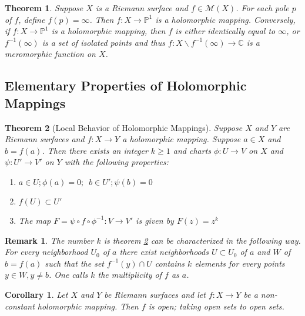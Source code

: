 \documentclass{article}
\newtheorem{thm}{Theorem}
\newtheorem{rmk}{Remark}
\newtheorem{cor}{Corollary}
\begin{document}
\begin{thm}

Suppose $X$ is a Riemann surface and $f \in \mathcal{M}(X)$. For each pole $p$ of $f$, define $f(p)= \infty$. Then $f: X \to \mathbb{P}^1$ is a holomorphic mapping. Conversely, if $f: X \to \mathbb{P}^1$ is a holomorphic mapping, then $f$ is either identically equal to $\infty$, or $f^{-1}(\infty)$ is a set of isolated points and thus $f: X \backslash f^{-1}(\infty) \to \mathbb{C}$ is a meromorphic function on $X$.
\end{thm}

\subsection{Elementary Properties of Holomorphic Mappings}

\begin{thm}[Local Behavior of Holomorphic Mappings]
\label{thm:local-holomorph}
Suppose $X$ and $Y$ are Riemann surfaces and $f: X \to Y$ a holomorphic mapping. Suppose $a \in X$ and $b = f(a)$. Then there exists an integer $k \geq 1$ and charts $\phi:U \to V$ on $X$ and $\psi: U' \to V'$ on $Y$ with the following properties:

\begin{enumerate}
    \item $a \in U; \phi(a)=0; \hspace{6pt} b \in U'; \psi(b)=0$
    \item $f(U) \subset U'$
    \item The map $F = \psi \circ f \circ \phi^{-1}: V \to V'$ is given by $F(z) = z^k$
\end{enumerate}


\end{thm}

\begin{rmk}

The number $k$ is theorem \ref{thm:local-holomorph} can be characterized in the following way. For every neighborhood $U_0$ of $a$ there exist neighborhoods $U \subset U_0$ of $a$ and $W$ of $b=f(a)$ such that the set $f^{-1}(y) \cap U$ contains $k$ elements for every points $y \in W, y \neq b$. One calls $k$ the \textit{multiplicity} of $f$ as $a$.

\end{rmk}

\begin{cor}

Let $X$ and $Y$ be Riemann surfaces and let $f: X \to Y$ be a non-constant holomorphic mapping. Then $f$ is open; taking open sets to open sets.

\end{cor}
\end{document}
